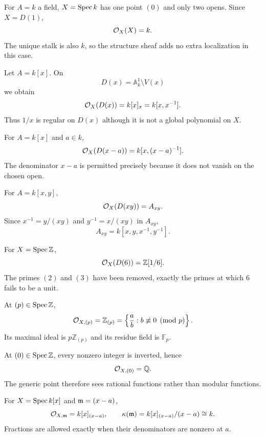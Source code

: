 \begin{example}
For $A=k$ a field, $X=\operatorname{Spec} k$ has one point $(0)$ and only two opens.  Since
$X=D(1)$,
\[
\mathcal O_X(X)=k.
\]
The unique stalk is also $k$, so the structure sheaf adds no extra localization in this case.
\end{example}

\begin{example}
Let $A=k[x]$.  On
\[
D(x)=\mathbb A^1_k\setminus V(x)
\]
we obtain
\[
\mathcal O_X(D(x))=k[x]_x=k[x,x^{-1}].
\]
Thus $1/x$ is regular on $D(x)$ although it is not a global polynomial on $X$.
\end{example}

\begin{example}
For $A=k[x]$ and $a\in k$,
\[
\mathcal O_X(D(x-a))=k[x,(x-a)^{-1}].
\]
The denominator $x-a$ is permitted precisely because it does not vanish on the chosen open.
\end{example}

\begin{example}
For $A=k[x,y]$,
\[
\mathcal O_X(D(xy))=A_{xy}.
\]
Since $x^{-1}=y/(xy)$ and $y^{-1}=x/(xy)$ in $A_{xy}$,
\[
A_{xy}=k[x,y,x^{-1},y^{-1}].
\]
\end{example}

\begin{example}
For $X=\operatorname{Spec}\mathbb Z$,
\[
\mathcal O_X(D(6))=\mathbb Z[1/6].
\]
The primes $(2)$ and $(3)$ have been removed, exactly the primes at which $6$ fails to be a unit.
\end{example}

\begin{example}
At $(p)\in\operatorname{Spec}\mathbb Z$,
\[
\mathcal O_{X,(p)}=\mathbb Z_{(p)}
=\left\{\frac ab:b\not\equiv0\pmod p\right\}.
\]
Its maximal ideal is $p\mathbb Z_{(p)}$ and its residue field is $\mathbb F_p$.
\end{example}

\begin{example}
At $(0)\in\operatorname{Spec}\mathbb Z$, every nonzero integer is inverted, hence
\[
\mathcal O_{X,(0)}=\mathbb Q.
\]
The generic point therefore sees rational functions rather than modular functions.
\end{example}

\begin{example}
For $X=\operatorname{Spec} k[x]$ and $\mathfrak m=(x-a)$,
\[
\mathcal O_{X,\mathfrak m}=k[x]_{(x-a)},\qquad
\kappa(\mathfrak m)=k[x]_{(x-a)}/(x-a)\cong k.
\]
Fractions are allowed exactly when their denominators are nonzero at $a$.
\end{example}

